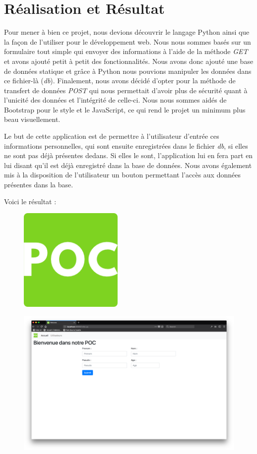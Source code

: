 \documentclass[12pt]{article}
\begin{document}
\section{Réalisation et Résultat}
Pour mener à bien ce projet, nous devions découvrir le langage Python ainsi que la façon de l'utiliser pour le développement web. Nous nous sommes basés sur un formulaire tout simple qui envoyer des informations à l'aide de la méthode \textit{GET} et avons ajouté petit à petit des fonctionnalités. Nous avons donc ajouté une base de données statique et grâce à Python nous pouvions manipuler les données dans ce fichier-là (\textit{db}). Finalement, nous avons décidé d'opter pour la méthode de transfert de données \textit{POST} qui nous permettait d'avoir plus de sécurité quant à l'unicité des données et l'intégrité de celle-ci. Nous nous sommes aidés de Bootstrap pour le style et le JavaScript, ce qui rend le projet un minimum plus beau visuellement. \par
Le but de cette application est de permettre à l'utilisateur d'entrée ces informations personnelles, qui sont ensuite enregistrées dans le fichier \textit{db}, si elles ne sont pas déjà présentes dedans. Si elles le sont, l'application lui en fera part en lui disant qu'il est déjà enregistré dans la base de données. Nous avons également mis à la disposition de l'utilisateur un bouton permettant l'accès aux données présentes dans la base.\par
Voici le résultat :
\begin{figure}[H]
\includegraphics[width=5cm]{images/logo.png}
\centering
\end{figure}
\begin{figure}[H]
\includegraphics[width=15cm]{images/index.png}
\centering
\end{figure}
\end{document}
